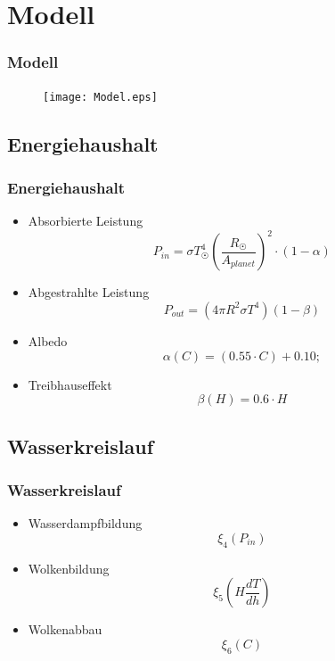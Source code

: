 \documentclass[english, aspectratio=169]{beamer}
\begin{document}



\section{Modell} 
\begin{frame}
	\frametitle{Modell}
	\begin{figure}
		\texttt{[image: Model.eps]}
	\end{figure}
\end{frame}

\subsection{Energiehaushalt}
\begin{frame}
\frametitle{Energiehaushalt}
\begin{itemize}
	\item[] Absorbierte Leistung
	\begin{equation}
	P_{in} = \sigma T_{\astrosun}^4 \left( \frac{R_{\astrosun}}{A_{planet}} \right) ^2 \cdot (1-\alpha)
	\end{equation}
	\pause
	
	\item[] Abgestrahlte Leistung
	\begin{equation}
	P_{out} = (4 \pi R^2 \sigma T^4)(1 - \beta)
	\end{equation}
	\pause
	
	\item[] Albedo
	\begin{equation}
	\alpha(C) = (0.55 \cdot C) + 0.10;
	\end{equation}
	\pause
	
	\item[] Treibhauseffekt
	\begin{equation}
	\beta(H) = 0.6 \cdot H
	\end{equation}
\end{itemize}
\end{frame}




\subsection{Wasserkreislauf}

\begin{frame}
	\frametitle{Wasserkreislauf}
	\begin{itemize}
		\item[] Wasserdampfbildung
			\begin{equation}
			\xi_4 (P_{in})
			\end{equation} 
		\pause
		\item[] Wolkenbildung
			\begin{equation}
			\xi_5 \left( H \frac{dT}{dh} \right)
			\end{equation}
		\pause
		\item[] Wolkenabbau 
		 	\begin{equation}
			\xi_6 (C)
			\end{equation}
	\end{itemize}
\end{frame}
\end{document}
